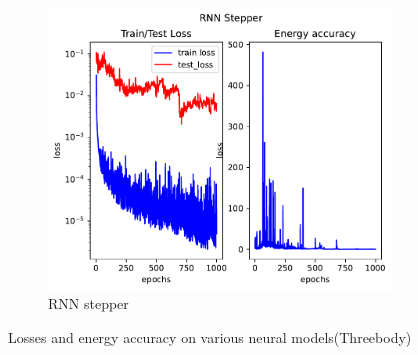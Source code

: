 \begin{figure}[H]
\begin{subfigure}[b]{0.3\textwidth}
		\includegraphics[width=\textwidth]{chapters/chapter5/body3_rne_loss.pdf}
		\caption{RNN stepper}
	\end{subfigure}
	
	\caption{Losses and energy accuracy on various neural models(Threebody)}
\end{figure}

